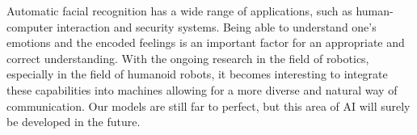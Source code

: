 Automatic facial recognition has a wide range of applications, such as human-computer interaction and security systems. Being able to understand one’s emotions and the encoded feelings is an important factor for an appropriate and correct understanding. With the ongoing research in the field of robotics, especially in the field of humanoid robots, it becomes interesting to integrate these capabilities into machines allowing for a more diverse and natural way of communication. Our models are still far to perfect, but this area of AI will surely be developed in the future.